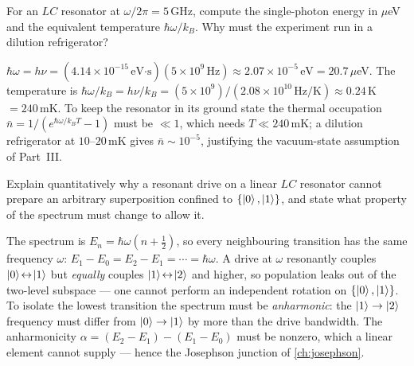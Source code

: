 \begin{exercise}
For an $LC$ resonator at $\omega/2\pi=5\,$GHz, compute the
single-photon energy in $\mu$eV and the equivalent temperature
$\hbar\omega/k_B$. Why must the experiment run in a dilution
refrigerator?
\begin{solution}
$\hbar\omega=h\nu=(4.14\times10^{-15}\,\text{eV·s})(5\times10^9\,\text{Hz})
\approx2.07\times10^{-5}\,\text{eV}=20.7\,\mu$eV. The temperature is
$\hbar\omega/k_B=h\nu/k_B=(5\times10^9)/(2.08\times10^{10}\,\text{Hz/K})
\approx0.24\,$K$=240\,$mK. To keep the resonator in its ground state
the thermal occupation $\bar n=1/(e^{\hbar\omega/k_BT}-1)$ must be
$\ll1$, which needs $T\ll240\,$mK; a dilution refrigerator at
$10$--$20\,$mK gives $\bar n\sim10^{-5}$, justifying the vacuum-state
assumption of Part~III.
\end{solution}
\end{exercise}

\begin{exercise}
Explain quantitatively why a resonant drive on a linear $LC$ resonator
cannot prepare an arbitrary superposition confined to $\{\ket0,\ket1\}$,
and state what property of the spectrum must change to allow it.
\begin{solution}
The spectrum is $E_n=\hbar\omega(n+\tfrac12)$, so every neighbouring
transition has the same frequency $\omega$: $E_1-E_0=E_2-E_1=\cdots
=\hbar\omega$. A drive at $\omega$ resonantly couples $\ket0\!\leftrightarrow\!\ket1$
but \emph{equally} couples $\ket1\!\leftrightarrow\!\ket2$ and higher, so
population leaks out of the two-level subspace --- one cannot perform an
independent rotation on $\{\ket0,\ket1\}$. To isolate the lowest
transition the spectrum must be \emph{anharmonic}: the
$\ket1\to\ket2$ frequency must differ from $\ket0\to\ket1$ by more than
the drive bandwidth. The anharmonicity $\alpha=(E_2-E_1)-(E_1-E_0)$
must be nonzero, which a linear element cannot supply --- hence the
Josephson junction of \cref{ch:josephson}.
\end{solution}
\end{exercise}
